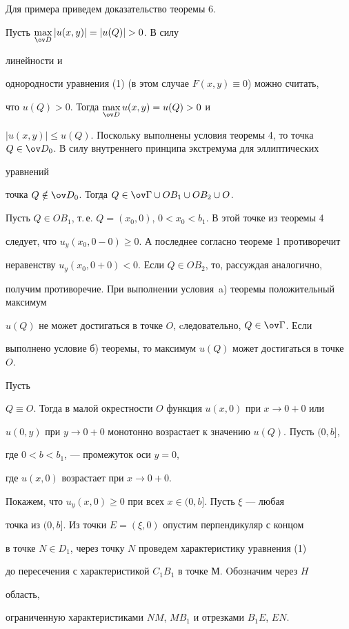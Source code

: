 Для примера приведем доказательство теоремы 6.


Пусть $\max \limits_{\ov D} |u(x,y)|=|u(Q)|>0$. В силу 


линейности и 


однородности уравнения (1) (в этом случае $F(x,y)\equiv 0$) можно считать, 


что $u(Q)>0$. Тогда $\max \limits_{\ov D} u(x,y)=u(Q)>0$ и 


$|u(x,y)|\le u(Q)$. Поскольку выполнены условия теоремы 4, то точка $Q\in 


\ov D_0$. В силу внутреннего принципа экстремума для эллиптических 


уравнений


точка $Q\notin \ov D_0$. Тогда $Q\in \ov \Gamma\cup OB_1\cup OB_2\cup O$.


Пусть $Q\in OB_1$, т.\,е. $Q=(x_0,0)$, $0<x_0<b_1$. В этой точке из теоремы 4


следует, что $u_y(x_0,0-0)\ge 0$. А последнее согласно теореме 1 противоречит


неравенству $u_y(x_0,0+0)<0$. Если $Q\in OB_2$, то, рассуждая аналогично, 


получим противоречие. При выполнении условия~a) теоремы положительный максимум


$u(Q)$ не может достигаться в точке $O$, cледовательно, $Q\in\ov\Gamma$. Если


выполнено условие б) теоремы, то максимум $u(Q)$ может достигаться в точке $O$. 


Пусть 


$Q\equiv O$. Тогда в малой окрестности $O$ функция $u(x,0)$ при $x\to 0+0$ или


$u(0,y)$ при $y\to 0+0$ монотонно возрастает к значению $u(Q)$. Пусть $(0,b]$,


где $0<b<b_1$, --- промежуток оси $y=0$,


где $u(x,0)$ возрастает при $x\to 0+0$.


Покажем, что $u_y(x,0)\ge 0$ при всех $x\in (0,b]$. Пусть $\xi$ --- любая


точка из $(0,b]$. Из точки $E=(\xi, 0)$ опустим перпендикуляр с концом


в точке $N\in D_1$, через точку $N$ проведем характеристику уравнения (1) 


до пересечения с характеристикой $C_1B_1$ в точке $М$. Oбозначим через $H$ 


область,


ограниченную характеристиками $NM$, $MB_1$ и отрезками $B_1E$, $EN$.


